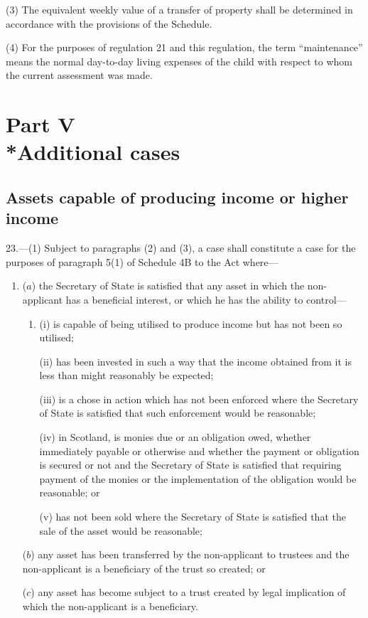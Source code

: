 \documentclass[a4paper]{article}
\newcommand{\parthead}{}
\begin{document}
(3) The equivalent weekly value of a transfer of property shall be determined in
accordance with the provisions of the Schedule.

(4) For the purposes of regulation 21 and this regulation, the term
“maintenance” means the normal day-to-day living expenses of the child with
respect to whom the current assessment was made.

\section[Part V --- Additional cases]{Part V\\*Additional cases}

\renewcommand\parthead{--- Part V}

\subsection[23. Assets capable of producing income or higher income]{Assets capable of producing income or higher income}

23.—(1)
Subject to paragraphs (2) and (3), a case shall constitute a case for the
purposes of paragraph 5(1) of Schedule 4B to the Act where—
\begin{enumerate}\item[]
($a$) the Secretary of State is satisfied that any asset in which the non-applicant
has a beneficial interest, or which he has the ability to control—
\begin{enumerate}\item[]
(i) is capable of being utilised to produce income but has not been so utilised;

(ii) has been invested in such a way that the income obtained from it is less
than might reasonably be expected;

(iii) is a chose in action which has not been enforced where the Secretary of
State is satisfied that such enforcement would be reasonable;

(iv) in Scotland, is monies due or an obligation owed, whether immediately
payable or otherwise and whether the payment or obligation is secured or not and
the Secretary of State is satisfied that requiring payment of the monies or the
implementation of the obligation would be reasonable; or

(v) has not been sold where the Secretary of State is satisfied that the sale of
the asset would be reasonable;
\end{enumerate}

($b$) any asset has been transferred by the non-applicant to trustees and the
non-applicant is a beneficiary of the trust so created; or

($c$) any asset has become subject to a trust created by legal implication of which
the non-applicant is a beneficiary.
\end{enumerate}
\end{document}
